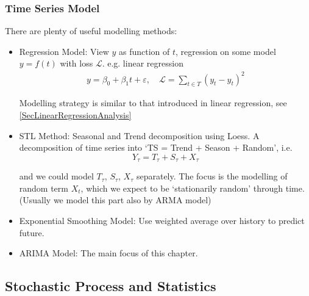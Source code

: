 \subsubsection{Time Series Model}
    There are plenty of useful modelling methods:
    \begin{itemize}[topsep=2pt,itemsep=0pt]
        \item Regression Model: View $ y $ as function of $ t $, regression on some model $ y=f(t) $ with loss $ \mathcal{L} $. e.g. linear regression
        \begin{align*}
            y=\beta _0+\beta _1t+\varepsilon ,\quad \mathcal{L}=\sum_{t\in T}(y_t-\hat{y}_t)^2 
        \end{align*}
        
        Modelling strategy is similar to that introduced in linear regression, see \autoref{SecLinearRegressionAnalysis} 
        
        \item STL Method: Seasonal and Trend decomposition using Loess. A decomposition of time series into `TS = Trend + Season + Random', i.e.
        \begin{equation}
            Y_\tau=T_\tau+S_\tau+X_\tau 
        \end{equation}
    
        and we could model $ T_\tau $, $ S_{\tau} $, $ X_\tau $ separately. The focus is the modelling of random term $ X_t $, which we expect to be `stationarily random' through time. (Usually we model this part also by ARMA model)

        \item Exponential Smoothing Model: Use weighted average over history to predict future.

        \item ARIMA Model: The main focus of this chapter.
    \end{itemize}
    






\subsection{Stochastic Process and Statistics}
